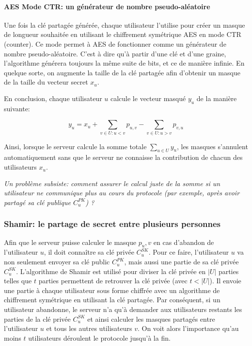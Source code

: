 \documentclass{article}
\begin{document}
\paragraph{AES Mode CTR: un générateur de nombre pseudo-aléatoire}

Une fois la clé partagée générée, chaque utilisateur l'utilise pour créer un masque de longueur souhaitée en utilisant le chiffrement symétrique AES en mode CTR (counter). Ce mode permet à AES de fonctionner comme un générateur de nombre pseudo-aléatoire. C'est à dire qu'à partir d'une clé et d'une graine, l'algorithme générera toujours la même suite de bits, et ce de manière infinie.
En quelque sorte, on augmente la taille de la clé partagée afin d'obtenir un masque de la taille du vecteur secret $x_u$.

En conclusion, chaque utilisateur $u$ calcule le vecteur masqué $y_u$ de la manière suivante:

\[
   y_u = x_u + \sum_{v\in U:u<v}p_{u,v} - \sum_{v\in U:u>v}p_{v,u}
\]

Ainsi, lorsque le serveur calcule la somme totale $\sum_{u \in U}{y_u}$, les masques s'annulent automatiquement sans que le serveur ne connaisse la contribution de chacun des utilisateurs $x_u$.

\emph{Un problème subsiste: comment assurer le calcul juste de la somme si un utilisateur ne communique plus au cours du protocole (par exemple, après avoir partagé sa clé publique $C_{u}^{PK}$) ?}

\subsubsection{Shamir: le partage de secret entre plusieurs personnes}

Afin que le serveur puisse calculer le masque $p_u,v$ en cas d'abandon de l'utilisateur $u$, il doit connaître sa clé privée $C_u^{SK}$. Pour ce faire, l'utilisateur $u$ va non seulement envoyer sa clé public $C_u^{PK}$, mais aussi une partie de sa clé privée $C_u^{SK}$. L'algorithme de Shamir \cite{ShamirHowShareSecret1979} est utilisé pour diviser la clé privée en $|U|$ parties telles que $t$ parties permettent de retrouver la clé privée (avec $t < |U|$). Il envoie une partie à chaque utilisateur sous forme chiffrée avec un algorithme de chiffrement symétrique en utilisant la clé partagée.
Par conséquent, si un utilisateur abandonne, le serveur n'a qu'à demander aux utilisateurs restants les parties de la clé privée $C_u^{SK}$ et ainsi calculer les masques partagés entre l'utilisateur $u$ et tous les autres utilisateurs $v$.
On voit alors l'importance qu'au moins $t$ utilisateurs déroulent le protocole jusqu'à la fin.
\end{document}
